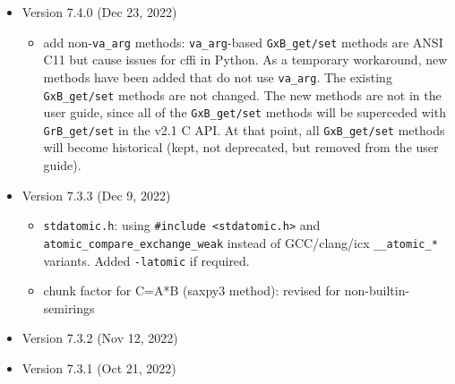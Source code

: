 \documentclass[12pt]{article}
\newenvironment{packed_itemize}{
\begin{itemize}
  \setlength{\itemsep}{1pt}
  \setlength{\parskip}{0pt}
  \setlength{\parsep}{0pt}
}{\end{itemize}}
\begin{document}
\begin{itemize}
\item Version 7.4.0 (Dec 23, 2022)

    \begin{itemize}
    \item add non-\verb'va_arg' methods: \verb'va_arg'-based \verb'GxB_get/set'
        methods are ANSI C11 but cause issues for cffi in Python.  As a
        temporary workaround, new methods have been added that do not use
        \verb'va_arg'.  The existing \verb'GxB_get/set' methods are not
        changed.  The new methods are not in the user guide, since all of the
        \verb'GxB_get/set' methods will be superceded with \verb'GrB_get/set'
        in the v2.1 C API.  At that point, all \verb'GxB_get/set' methods will
        become historical (kept, not deprecated, but removed from the user
        guide).
    \end{itemize}

\item Version 7.3.3 (Dec 9, 2022)

    \begin{itemize}
    \item \verb'stdatomic.h': using \verb'#include <stdatomic.h>' and
        \newline
        \verb'atomic_compare_exchange_weak'
        instead of GCC/clang/icx \verb'__atomic_*' variants.
        Added \verb'-latomic' if required.
    \item chunk factor for C=A*B (saxpy3 method):
        revised for non-builtin-semirings
    \end{itemize}

\item Version 7.3.2 (Nov 12, 2022)


\item Version 7.3.1 (Oct 21, 2022)



\end{itemize}
\end{document}
